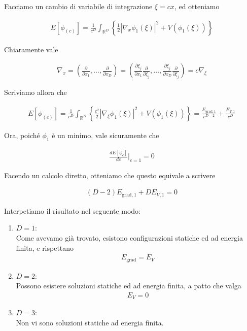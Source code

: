 \documentclass{report}
\begin{document}
Facciamo un cambio di variabile di integrazione \(\xi = cx\), ed otteniamo 

\begin{align}
    E[\phi_{(c)}] = \frac{1}{c^D}\int_{\mathbb{R}^D} \left\{\frac{1}{2}|\nabla_x \phi_1(\xi)|^2 + V(\phi_1(\xi))\right\}
\end{align}

Chiaramente vale 

\begin{align}
    \nabla_x = \left(\frac{\partial}{\partial x_1}, \ldots, \frac{\partial}{\partial x_D} \right) = \left(\frac{\partial \xi_j}{\partial x_1}\frac{\partial}{\partial \xi_j}, \ldots, \frac{\partial \xi_j}{\partial x_D}\frac{\partial}{\partial \xi_j} \right) = c \nabla_\xi
\end{align}

Scriviamo allora che 

\begin{align}
    E[\phi_{(c)}] = \frac{1}{c^D}\int_{\mathbb{R}^D} \left\{\frac{c^2}{2}|\nabla_\xi \phi_1(\xi)|^2 + V(\phi_1(\xi))\right\} = \frac{E_{\text{grad}, 1}}{c^{D-2}} + \frac{E_{V,1}}{c^D}
\end{align}

Ora, poiché \(\phi_1\) è un minimo, vale sicuramente che 

\begin{align}
    \frac{dE[\phi_c]}{dc}\biggr|_{c=1} = 0
\end{align}

Facendo un calcolo diretto, otteniamo che questo equivale a scrivere 

\begin{align}
    (D-2)E_{\text{grad}, 1} + DE_{V, 1} = 0 
\end{align}

Interpetiamo il risultato nel seguente modo: 

\begin{enumerate}
    \item \(D=1\): \\
    Come avevamo già trovato, esistono configurazioni statiche ed ad energia finita, e rispettano 
    \begin{align}
        E_{\text{grad}} = E_V
    \end{align}
    \item \(D=2\): \\
    Possono esistere soluzioni statiche ed ad energia finita, a patto che valga 
    \begin{align}
        E_V = 0 
    \end{align}
    \item \(D=3\): \\
    Non vi sono soluzioni statiche ad energia finita. 
\end{enumerate}
\end{document}
